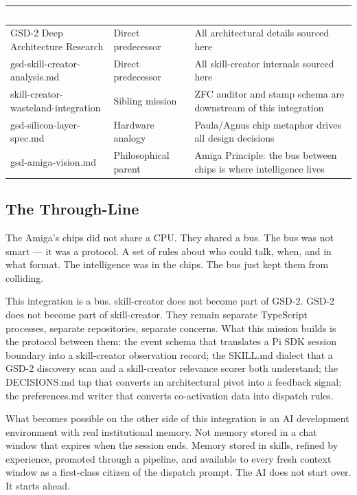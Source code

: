 \documentclass[11pt,letterpaper]{article}
\newcommand{\tableheader}[1]{\textbf{\sffamily\textcolor{white}{#1}}}
\begin{document}
\begin{center}
\begin{tabularx}{\textwidth}{L{4.5cm}L{3.5cm}X}
\toprule
{}
\tableheader{Document} & \tableheader{Relationship} & \tableheader{Interface} \\
\midrule
GSD-2 Deep Architecture Research & Direct predecessor & All architectural details sourced here \\
gsd-skill-creator-analysis.md & Direct predecessor & All skill-creator internals sourced here \\
skill-creator-wasteland-integration & Sibling mission & ZFC auditor and stamp schema are downstream of this integration \\
gsd-silicon-layer-spec.md & Hardware analogy & Paula/Agnus chip metaphor drives all design decisions \\
gsd-amiga-vision.md & Philosophical parent & Amiga Principle: the bus between chips is where intelligence lives \\
\bottomrule
\end{tabularx}
\end{center}

\subsection{The Through-Line}

The Amiga's chips did not share a CPU. They shared a bus. The bus was not smart --- it was a protocol. A set of rules about who could talk, when, and in what format. The intelligence was in the chips. The bus just kept them from colliding.

This integration is a bus. skill-creator does not become part of GSD-2. GSD-2 does not become part of skill-creator. They remain separate TypeScript processes, separate repositories, separate concerns. What this mission builds is the protocol between them: the event schema that translates a Pi SDK session boundary into a skill-creator observation record; the SKILL.md dialect that a GSD-2 discovery scan and a skill-creator relevance scorer both understand; the DECISIONS.md tap that converts an architectural pivot into a feedback signal; the preferences.md writer that converts co-activation data into dispatch rules.

What becomes possible on the other side of this integration is an AI development environment with real institutional memory. Not memory stored in a chat window that expires when the session ends. Memory stored in skills, refined by experience, promoted through a pipeline, and available to every fresh context window as a first-class citizen of the dispatch prompt. The AI does not start over. It starts ahead.
\end{document}
